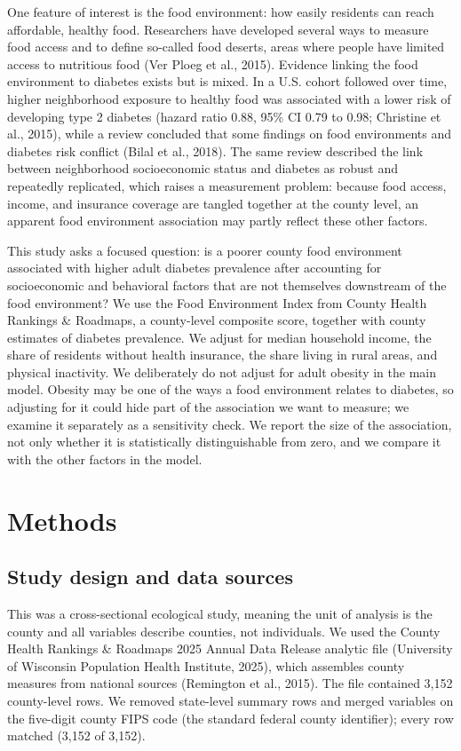 \documentclass[12pt]{article}
\begin{document}
One feature of interest is the food environment: how easily residents can reach affordable, healthy food. Researchers have developed several ways to measure food access and to define so-called food deserts, areas where people have limited access to nutritious food (Ver Ploeg et al., 2015). Evidence linking the food environment to diabetes exists but is mixed. In a U.S. cohort followed over time, higher neighborhood exposure to healthy food was associated with a lower risk of developing type 2 diabetes (hazard ratio 0.88, 95\% CI 0.79 to 0.98; Christine et al., 2015), while a review concluded that some findings on food environments and diabetes risk conflict (Bilal et al., 2018). The same review described the link between neighborhood socioeconomic status and diabetes as robust and repeatedly replicated, which raises a measurement problem: because food access, income, and insurance coverage are tangled together at the county level, an apparent food environment association may partly reflect these other factors.

This study asks a focused question: is a poorer county food environment associated with higher adult diabetes prevalence after accounting for socioeconomic and behavioral factors that are not themselves downstream of the food environment? We use the Food Environment Index from County Health Rankings \& Roadmaps, a county-level composite score, together with county estimates of diabetes prevalence. We adjust for median household income, the share of residents without health insurance, the share living in rural areas, and physical inactivity. We deliberately do not adjust for adult obesity in the main model. Obesity may be one of the ways a food environment relates to diabetes, so adjusting for it could hide part of the association we want to measure; we examine it separately as a sensitivity check. We report the size of the association, not only whether it is statistically distinguishable from zero, and we compare it with the other factors in the model.

\section*{Methods}
\subsection*{Study design and data sources}
This was a cross-sectional ecological study, meaning the unit of analysis is the county and all variables describe counties, not individuals. We used the County Health Rankings \& Roadmaps 2025 Annual Data Release analytic file (University of Wisconsin Population Health Institute, 2025), which assembles county measures from national sources (Remington et al., 2015). The file contained 3,152 county-level rows. We removed state-level summary rows and merged variables on the five-digit county FIPS code (the standard federal county identifier); every row matched (3,152 of 3,152).
\end{document}
